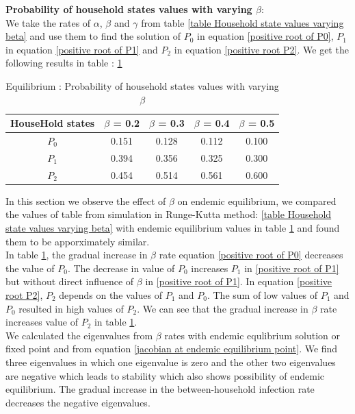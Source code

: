 \documentclass[paper=a4, fontsize=11pt, twoside, BCOR=12mm, parskip=full, listof=totoc]{scrreprt}
\begin{document}
{\textbf{Probability of household states values with varying $\beta$}: \\
We take the rates of $\alpha$, $\beta$ and $\gamma$ from table \ref{table Household state values varying beta} and use them to find the solution of $P_0$ in equation \ref{positive root of P0}, $P_1$ in equation \ref{positive root of P1} and $P_2$ in equation \ref{positive root P2}. We get the following results in table : \ref{root table Household state values varying beta}
\begin{table}[H]
	\centering 
	\caption{Equilibrium : Probability of household states values with varying $\beta$}
	\label{root table Household state values varying beta}
	\begin{tabular}{ccccc}
	\toprule
     HouseHold states & $\beta$ = 0.2 & $\beta$ = 0.3  & $\beta$ = 0.4 & $\beta$ = 0.5 \\
     \midrule
	 $P_0$ & 0.151 & 0.128  & 0.112  & 0.100 \\
	 $P_1$ & 0.394 & 0.356  & 0.325  & 0.300 \\
	 $P_2$ & 0.454 & 0.514  & 0.561  & 0.600 \\
	\bottomrule
	\end{tabular}
\end{table}
In this section we observe the effect of $\beta$ on endemic equilibrium, we compared the values of table from simulation in Runge-Kutta method: \ref{table Household state values varying beta} with endemic equilibrium values in table \ref{root table Household state values varying beta} and found them to be apporximately similar.\\ 
In table \ref{root table Household state values varying beta}, the gradual increase in $\beta$ rate equation \ref{positive root of P0} decreases the value of $P_0$. The decrease in value of $P_0$ increases $P_1$ in \ref{positive root of P1} but without direct influence of $\beta$ in \ref{positive root of P1}. In equation \ref{positive root P2}, $P_2$ depends on the values of $P_1$ and $P_0$. The sum of low values of $P_1$ and $P_0$ resulted in high values of $P_2$. We can see that the gradual increase in $\beta$ rate increases value of $P_2$ in table \ref{root table Household state values varying beta}.\\    
We calculated the eigenvalues from $\beta$ rates with endemic equlibrium solution or fixed point and from equation \ref{jacobian at endemic equilibrium point}. We find three eigenvalues in which one eigenvalue is zero and the  other two eigenvalues are negative which leads to stability which also shows possibility of endemic equilibrium. The gradual increase in the between-household infection rate decreases the negative eigenvalues.\\ 

}
\end{document}
